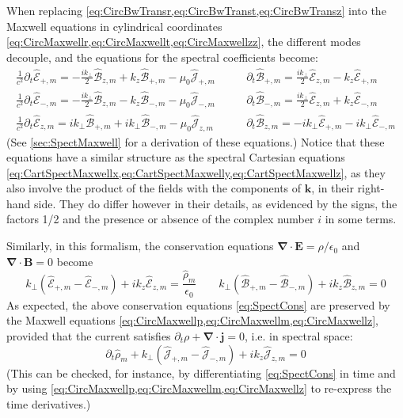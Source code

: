 \documentclass[1p,times]{elsarticle}
\renewcommand{\vec}[1]{\boldsymbol{#1}}
\newcommand{\spectral}[1]{\hat{\mathcal{#1}}}
\begin{document}
When replacing \cref{eq:CircBwTransr,eq:CircBwTranst,eq:CircBwTransz} into the Maxwell equations in cylindrical
coordinates \cref{eq:CircMaxwellr,eq:CircMaxwellt,eq:CircMaxwellzz},
the different modes decouple, and the equations for the spectral
coefficients become:
\begin{subequations}
\begin{align}
\frac{1}{c^2}\partial_t \spectral{E}_{+,m} = - \frac{ik_\perp }{2}\spectral{B}_{z,m} + k_z\spectral{B}_{+,m} - \mu_0\spectral{J}_{+,m} \qquad &   
\partial_t \spectral{B}_{+,m} = \frac{ik_\perp }{2} \spectral{E}_{z,m} - k_z
\spectral{E}_{+,m} 
\label{eq:CircMaxwellp} \\
\frac{1}{c^2}\partial_t \spectral{E}_{-,m} = -\frac{ik_\perp }{2} \spectral{B}_{z,m} - k_z \spectral{B}_{-,m} - \mu_0  \spectral{J}_{-,m} \qquad &   
\partial_t \spectral{B}_{-,m} = \frac{ik_\perp }{2} \spectral{E}_{z,m} + k_z
\spectral{E}_{-,m} \label{eq:CircMaxwellm} \\
\frac{1}{c^2}\partial_t \spectral{E}_{z,m} = ik_\perp  \spectral{B}_{+,m} + ik_\perp \spectral{B}_{-,m}  - \mu_0 \spectral{J}_{z,m}  \qquad & 
\partial_t \spectral{B}_{z,m} = -ik_\perp  \spectral{E}_{+,m} - ik_\perp \spectral{E}_{-,m}  \label{eq:CircMaxwellz} 
\end{align}
\end{subequations}
(See \ref{sec:SpectMaxwell} for a derivation of these equations.)
Notice that these equations have a similar structure as the spectral
Cartesian equations \cref{eq:CartSpectMaxwellx,eq:CartSpectMaxwelly,eq:CartSpectMaxwellz}, as 
they also involve the product of the fields with the components of
$\vec{k}$, in their right-hand side. They do differ however in their
details, as evidenced by the signs, the factors 1/2 and the
presence or absence of the complex number $i$ in some terms.

Similarly, in this formalism, the conservation equations
$\vec{\nabla}\cdot\vec{E}=\rho/\epsilon_0$ and
$\vec{\nabla}\cdot\vec{B} = 0$
become
\begin{equation}
\label{eq:SpectCons}
k_\perp (\spectral{E}_{+,m} -\spectral{E}_{-,m}) + ik_z \spectral{E}_{z,m} =
\frac{\spectral{\rho}_m}{\epsilon_0} \qquad
 k_\perp (\spectral{B}_{+,m} -\spectral{B}_{-,m}) + ik_z \spectral{B}_{z,m} =
0 \end{equation}
As expected, the above conservation equations \cref{eq:SpectCons} are
preserved by the Maxwell equations
\cref{eq:CircMaxwellp,eq:CircMaxwellm,eq:CircMaxwellz}, provided
that the current satisfies $\partial_t
\rho + \vec{\nabla} \cdot \vec{j} = 0$, i.e. in spectral space:
\begin{equation}
\label{eq:SpectCharge}
\partial_t \spectral{\rho}_m + k_\perp (\spectral{J}_{+,m} -\spectral{J}_{-,m}) + ik_z
\spectral{J}_{z,m} = 0
\end{equation} 
\noindent (This can be checked, for instance, by differentiating
\cref{eq:SpectCons} in time and by using
\cref{eq:CircMaxwellp,eq:CircMaxwellm,eq:CircMaxwellz} to re-express the
time derivatives.)
\end{document}
